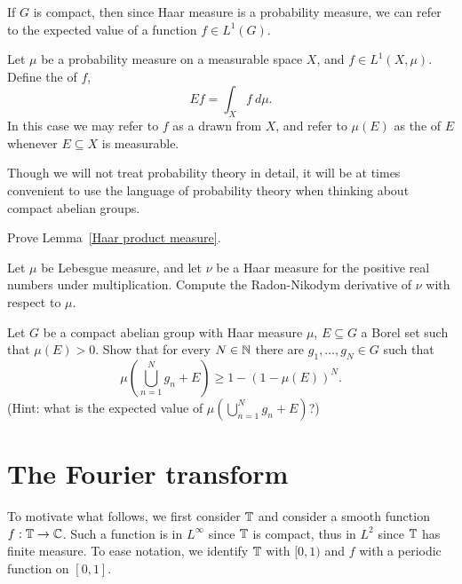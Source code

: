 If $G$ is compact, then since Haar measure is a probability measure, we can refer to the expected value of a function $f \in L^{1}(G)$.
\begin{definition}
Let $\mu$ be a probability measure on a measurable space $X$, and $f \in L^{1}(X, \mu)$.
Define the  of $f$,
\[Ef = \int_{X} f~d\mu.\]
In this case we may refer to $f$ as a  drawn from $X$, and refer to $\mu(E)$ as the  of $E$ whenever $E \subseteq X$ is measurable.
\end{definition}
Though we will not treat probability theory in detail, it will be at times convenient to use the language of probability theory when thinking about compact abelian groups.

\begin{exercise}\label{Haar product measure exercise}
Prove Lemma~\ref{Haar product measure}.
\end{exercise}

\begin{exercise}
Let $\mu$ be Lebesgue measure, and let $\nu$ be a Haar measure for the positive real numbers under multiplication.
Compute the Radon-Nikodym derivative of $\nu$ with respect to $\mu$.
\end{exercise}

\begin{exercise}
Let $G$ be a compact abelian group with Haar measure $\mu$, $E \subseteq G$ a Borel set such that $\mu(E) > 0$.
Show that for every $N \in \mathbb{N}$ there are $g_{1}, \dots, g_{N} \in G$ such that
\[\mu\left(\bigcup_{n=1}^{N} g_{n} + E\right) \geq 1 - {(1 - \mu(E))}^{N}.\]
(Hint: what is the expected value of $\mu\left(\bigcup_{n=1}^{N} g_{n} + E\right)$?)
\end{exercise}

\section{The Fourier transform}
To motivate what follows, we first consider $\mathbb{T}$ and consider a smooth function $f: \mathbb{T} \to \mathbb{C}$.
Such a function is in $L^{\infty}$ since $\mathbb{T}$ is compact, thus in $L^{2}$ since $\mathbb{T}$ has finite measure.
To ease notation, we identify $\mathbb{T}$ with $[0, 1)$ and $f$ with a periodic function on $[0, 1]$.

